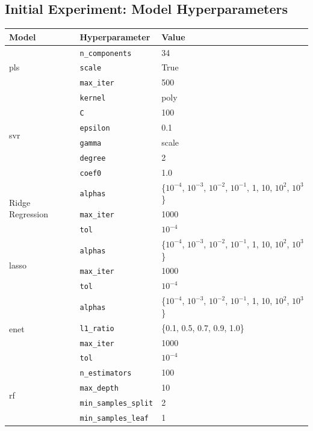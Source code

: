 \FloatBarrier

\subsection{Initial Experiment: Model Hyperparameters}\label{subsec:initial_experiment_hyperparameters}
\begin{table}
\centering
\begin{tabular}{@{}llp{}@{}}
\toprule
\textbf{Model} & \textbf{Hyperparameter} & \textbf{Value} \\
\midrule
\multirow{3}{*}{\gls{pls}}
& \texttt{n\_components} & 34 \\
& \texttt{scale} & True \\
& \texttt{max\_iter} & 500 \\
\midrule
\multirow{6}{*}{\gls{svr}}
& \texttt{kernel} & poly \\
& \texttt{C} & 100 \\
& \texttt{epsilon} & 0.1 \\
& \texttt{gamma} & scale \\
& \texttt{degree} & 2 \\
& \texttt{coef0} & 1.0 \\
\midrule
\multirow{3}{*}{Ridge Regression}
& \texttt{alphas} & \{$10^{-4}$, $10^{-3}$, $10^{-2}$, $10^{-1}$, 1, 10, $10^2$, $10^3$\} \\
& \texttt{max\_iter} & 1000 \\
& \texttt{tol} & $10^{-4}$ \\
\midrule
\multirow{3}{*}{\gls{lasso}}
& \texttt{alphas} & \{$10^{-4}$, $10^{-3}$, $10^{-2}$, $10^{-1}$, 1, 10, $10^2$, $10^3$\} \\
& \texttt{max\_iter} & 1000 \\
& \texttt{tol} & $10^{-4}$ \\
\midrule
\multirow{4}{*}{\gls{enet}}
& \texttt{alphas} & \{$10^{-4}$, $10^{-3}$, $10^{-2}$, $10^{-1}$, 1, 10, $10^2$, $10^3$\} \\
& \texttt{l1\_ratio} & \{0.1, 0.5, 0.7, 0.9, 1.0\} \\
& \texttt{max\_iter} & 1000 \\
& \texttt{tol} & $10^{-4}$ \\
\midrule
\multirow{6}{*}{\gls{rf}}
& \texttt{n\_estimators} & 100 \\
& \texttt{max\_depth} & 10 \\
& \texttt{min\_samples\_split} & 2 \\
& \texttt{min\_samples\_leaf} & 1 \\

\end{tabular}
\end{table}
